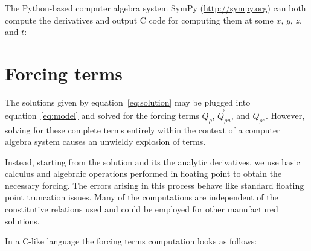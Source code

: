 \documentclass[10pt,reqno]{amsart}
\begin{document}
The Python-based computer algebra system SymPy (\url{http://sympy.org})
can both compute the derivatives and output C code for computing them
at some $x$, $y$, $z$, and $t$:


\section{Forcing terms}

The solutions given by equation~\eqref{eq:solution} may be plugged into
equation~\eqref{eq:model} and solved for the forcing terms $Q_{\rho}$,
$\vec{Q}_{\rho{}u}$, and $Q_{\rho{}e}$.  However, solving for these complete
terms entirely within the context of a computer algebra system causes an
unwieldy explosion of terms.

Instead, starting from the solution and its the analytic derivatives, we use
basic calculus and algebraic operations performed in floating point to obtain
the necessary forcing.  The errors arising in this process behave like standard
floating point truncation issues.  Many of the computations are independent of
the constitutive relations used and could be employed for other manufactured
solutions.

In a C-like language the forcing terms computation looks as follows:

\end{document}
